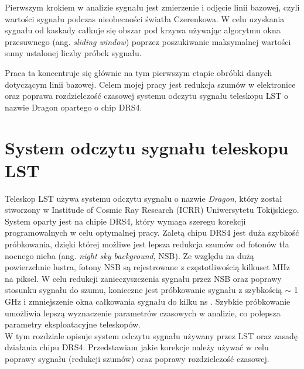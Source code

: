 \documentclass[a4paper,11pt,twoside]{article}
\begin{document}
Pierwszym krokiem w analizie sygnału jest zmierzenie i odjęcie linii bazowej, czyli wartości sygnału podczas nieobecności światła Czerenkowa. W celu uzyskania sygnału od kaskady całkuje się obszar pod krzywa używając algorytmu okna przesuwnego (ang. \textsl{sliding window}) poprzez poszukiwanie maksymalnej wartości sumy ustalonej liczby próbek sygnału.

Praca ta koncentruje się głównie na tym pierwszym etapie obróbki danych dotyczącym linii bazowej. Celem mojej pracy jest redukcja szumów w elektronice oraz poprawa rozdzielczość czasowej systemu odczytu sygnału teleskopu LST o nazwie Dragon opartego o chip DRS4.

\newpage
\section{System odczytu sygnału teleskopu LST}
Teleskop LST używa systemu odczytu sygnału o nazwie \textsl{Dragon}, który został stworzony w Institude of Cosmic Ray Research (ICRR) Uniwersytetu Tokijskiego. System oparty jest na chipie DRS4, który wymaga szeregu korekcji programowalnych w celu optymalnej pracy. Zaletą chipu DRS4 jest duża szybkość próbkowania, dzięki której możliwe jest lepsza redukcja szumów od fotonów tła nocnego nieba (ang. \textsl{night sky background}, NSB).
Ze względu na dużą powierzchnie lustra, fotony NSB są rejestrowane z częstotliwością kilkuset MHz na piksel. W celu redukcji zanieczyszczenia sygnału przez NSB oraz poprawy stosunku sygnału do szumu, konieczne jest próbkowanie  sygnału z szybkością $\sim$ 1 GHz i zmniejszenie okna całkowania sygnału do kilku ns \cite{dragon_lst}. Szybkie próbkowanie umożliwia lepszą wyznaczenie parametrów czasowych w analizie, co polepsza parametry eksploatacyjne teleskopów. \\
W tym rozdziale opisuje system odczytu sygnału używany przez LST oraz zasadę działania chipu DRS4. Przedstawiam jakie korekcje należy używać w celu poprawy sygnału (redukcji szumów) oraz poprawy rozdzielczość czasowej. 
\end{document}
